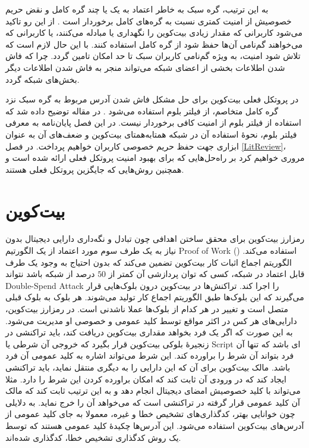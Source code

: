 به این ترتیب،‌ گره سبک به خاطر اعتماد به یک یا چند گره کامل و نقض حریم خصوصیش از امنیت کمتری نسبت به گره‌های کامل برخوردار است \cite{Sompolinsky2016}. از این رو تاکید می‌شود کاربرانی که مقدار زیادی بیت‌کوین را نگهداری یا مبادله می‌کنند، یا کاربرانی که می‌خواهند گم‌نامی آن‌ها حفظ شود از گره‌ کامل استفاده کنند. با این حال لازم است که تلاش شود امنیت، به ویژه گم‌نامی کاربران سبک تا حد امکان تامین گردد. چرا که فاش شدن اطلاعات بخشی از اعضای شبکه می‌تواند منجر به فاش شدن اطلاعات دیگر بخش‌های شبکه گردد.

در پروتکل فعلی بیت‌کوین برای حل مشکل فاش شدن آدرس مربوط به گره سبک نزد گره کامل متخاصم،  از فیلتر بلوم استفاده می‌شود \cite{Hearn2013}. در مقاله \cite{Gervais2014} توضیح داده ‌شد که استفاده از فیلتر بلوم از امنیت کافی برخوردار نیست. در این فصل پایان‌نامه به معرفی فیلتر بلوم، نحوهٔ استفاده آن در شبکه همتا‌به‌همتای بیت‌کوین و ضعف‌های آن به عنوان ابزاری جهت حفظ حریم خصوصی کاربران خواهیم پرداخت. در فصل \ref{LitReview}، مروری خواهیم کرد بر راه‌حل‌هایی که برای بهبود امنیت پروتکل فعلی ارائه شده است و همچنین روش‌هایی که جایگزین پروتکل فعلی هستند.


\section{بیت‌کوین}

رمزارز بیت‌کوین برای محقق ساختن اهدافی چون تبادل و نگه‌داری دارایی دیجیتال بدون نیاز به یک طرف سوم مورد اعتماد از یک الگورتیم 
\gls{Proof of Work} ()
استفاده می‌کند\cite{Nakamoto2009}. الگوریتم اجماع اثبات کار بیت‌کوین تضمین می‌کند که بدون احتیاج به  وجود یک طرف قابل اعتماد در شبکه، کسی که توان پردازشی آن کمتر از $50$ درصد از شبکه باشد نتواند 
\gls{Double-Spend Attack}
را اجرا کند. تراکنش‌ها در بیت‌کوین درون بلوک‌هایی قرار می‌گیرند که این بلوک‌ها طبق الگوریتم اجماع کار تولید می‌شوند. هر بلوک به بلوک قبلی متصل است و تغییر در هر کدام از بلوک‌ها عملا ناشدنی است. در رمزارز بیت‌کوین، دارایی‌های هر کس در اکثر مواقع توسط کلید عمومی و خصوصی او مدیریت می‌شود. به این صورت که اگر یک فرد بخواهد مقداری بیت‌کوین دریافت کند، باید تراکنشی در زنجیرهٔ بلوکی بیت‌کوین قرار بگیرد که خروجی آن شرطی یا 
\gls{Script}
ای باشد که تنها آن فرد بتواند آن شرط را براورده کند. این شرط می‌تواند اشاره به کلید عمومی آن فرد باشد. مالک بیت‌کوین برای آن که این دارایی را به دیگری منتقل نماید، باید تراکنشی ایجاد کند که در ورودی آن ثابت کند که امکان براورده کردن این شرط را دارد. مثلا می‌تواند با کلید خصوصیش امضای دیجیتال انجام دهد و به این ترتیب ثابت کند که مالک آن کلید عمومی قرار گرفته در تراکنشی است که می‌خواهد آن را خرج نماید. به دلایلی چون خوانایی بهتر، کدگذاری‌های تشخیص خطا و غیره، معمولا به جای کلید عمومی از آدرس‌های بیت‌کوین استفاده می‌شود. این آدرس‌ها چکیدهٔ کلید عمومی هستند که توسط یک روش کدگذاری تشخیص خطا، کدگذاری شده‌اند.

